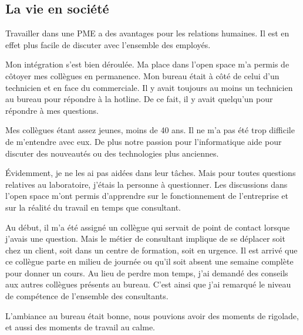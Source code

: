 \subsection{La vie en société}
Travailler dans une PME a des avantages pour les relations humaines.
Il est en effet plus facile de discuter avec l'ensemble des employés.

Mon intégration s'est bien déroulée. 
Ma place dans l'open space m'a permis de côtoyer mes collègues en permanence.
Mon bureau était à côté de celui d'un technicien et en face du commerciale.
Il y avait toujours au moins un technicien au bureau pour répondre à la hotline.
De ce fait, il y avait quelqu'un pour répondre à mes questions. 

Mes collègues étant assez jeunes, moins de 40 ans.
Il ne m'a pas été trop difficile de m'entendre avec eux.
De plus notre passion pour l'informatique aide pour discuter des nouveautés ou des technologies plus anciennes.

\'Evidemment, je ne les ai pas aidées dans leur tâches.
Mais pour toutes questions relatives au laboratoire, j'étais la personne à questionner. 
Les discussions dans l'open space m'ont permis d'apprendre sur le fonctionnement de l'entreprise et sur la réalité du travail en temps que consultant.

Au début, il m'a été assigné un collègue qui servait de point de contact lorsque j'avais une question.
Mais le métier de consultant implique de se déplacer soit chez un client, soit dans un centre de formation, soit en urgence.
Il est arrivé que ce collègue parte en milieu de journée ou qu'il soit absent une semaine complète pour donner un cours.
Au lieu de perdre mon temps, j'ai demandé des conseils aux autres collègues présents au bureau.
C'est ainsi que j'ai remarqué le niveau de compétence de l'ensemble des consultants.

L'ambiance au bureau était bonne, nous pouvions avoir des moments de rigolade, et aussi des moments de travail au calme.

